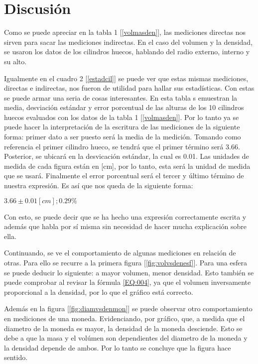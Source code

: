 \documentclass[%
 reprint,
groupedaddress,
unsortedaddress,
 amsmath,amssymb,
 aps,
superscriptaddress
]{revtex4-2}
\begin{document}
\section{Discusión}
\label{Sec:Disc}

Como se puede apreciar en la tabla 1 [\ref{volmasden}], las mediciones directas nos sirven para sacar las mediciones indirectas. En el caso del volumen y la densidad, se usaron los datos de los cilindros huecos, hablando del radio externo, interno y su alto.

Igualmente en el cuadro 2 [\ref{estadcil}] se puede ver que estas mismas mediciones, directas e indirectas, nos fueron de utilidad para hallar sus estadísticas. Con estas se puede armar una seria de cosas interesantes. En esta tabla s emuestran la media, desviación estándar y error porcentual de las alturas de los 10 cilindros huecos evaluados con los datos de la tabla 1 [\ref{volmasden}]. Por lo tanto ya se puede hacer la interpretación de la escritura de las mediciones de la siguiente forma: primer dato a ser puesto será la media de la medición. Tomando como referencia el primer cilindro hueco, se tendrá que el primer término será 3.66. Posterior, se ubicará en la desvicación estándar, la cual es 0.01. Las unidades de medida de cada figura están en [cm], por lo tanto, esta será la unidad de medida que se usará. Finalmente el error porcentual será el tercer y último término de nuestra expresión. Es así que nos queda de la siguiente forma:


\begin{center} {$3.66 \pm 0.01 [cm] ; 0.29\%$} \end{center}

Con esto, se puede decir que se ha hecho una expresión correctamente escrita y además que habla por sí misma sin necesidad de hacer mucha explicación sobre ella.

Continuando, se ve el comportamiento de algunas mediciones en relación de otras. Para ello se recurre a la primera figura [\ref{fig:volvsdenesf}]. Para una esfera se puede deducir lo siguiente: a mayor volumen, menor densidad. Esto también se puede comprobar al revisar la fórmula \eqref{EQ:004}, ya que el volumen inversamente proporcional a la densidad, por lo que el gráfico está correcto.

Además en la figura [\ref{fig:diamvsdenmon}] se puede observar otro comportamiento en mediciones de una moneda. Evidenciando, por gráfico, que, a medida que el diametro de la moneda es mayor, la densidad de la moneda desciende. Esto se debe a que la masa y el volúmen son dependientes del diametro de la moneda y la densidad depende de ambos. Por lo tanto se concluye que la figura hace sentido.
\end{document}
